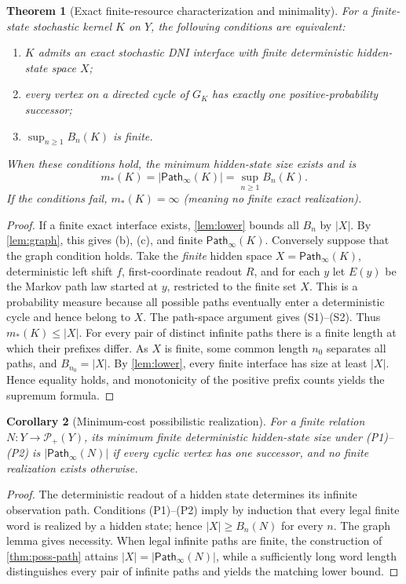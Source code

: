 \documentclass[11pt,letterpaper]{article}
\newtheorem{theorem}{Theorem}[section]
\newtheorem{corollary}[theorem]{Corollary}
\theoremstyle{definition}\newtheorem{definition}[theorem]{Definition}
\theoremstyle{remark}\newtheorem{remark}[theorem]{Remark}
\newcommand{\PP}{\mathcal{P}}
\newcommand{\Paths}{\mathsf{Path}}
\begin{document}
\begin{theorem}[Exact finite-resource characterization and minimality]\label{thm:minimum}
For a finite-state stochastic kernel $K$ on $Y$, the following conditions are equivalent:
\begin{enumerate}[label=(\alph*)]
\item $K$ admits an exact stochastic DNI interface with finite deterministic hidden-state space $X$;
\item every vertex on a directed cycle of $G_K$ has exactly one positive-probability successor;
\item $\sup_{n\ge1}B_n(K)$ is finite.
\end{enumerate}
When these conditions hold, the minimum hidden-state size exists and is
\begin{equation}\label{eq:minimum}
\boxed{m_*(K)=|\Paths_\infty(K)|=\sup_{n\ge1}B_n(K).}
\end{equation}
If the conditions fail, $m_*(K)=\infty$ (meaning no \emph{finite} exact realization).
\end{theorem}
\begin{proof}
If a finite exact interface exists, \cref{lem:lower} bounds all $B_n$ by $|X|$. By \cref{lem:graph}, this gives (b), (c), and finite $\Paths_\infty(K)$.
Conversely suppose that the graph condition holds. Take the \emph{finite} hidden space $X=\Paths_\infty(K)$, deterministic left shift $f$, first-coordinate readout $R$, and for each $y$ let $E(y)$ be the Markov path law started at $y$, restricted to the finite set $X$. This is a probability measure because all possible paths eventually enter a deterministic cycle and hence belong to $X$. The path-space argument gives (S1)--(S2). Thus $m_*(K)\le|X|$.
For every pair of distinct infinite paths there is a finite length at which their prefixes differ. As $X$ is finite, some common length $n_0$ separates all paths, and $B_{n_0}=|X|$. By \cref{lem:lower}, every finite interface has size at least $|X|$. Hence equality holds, and monotonicity of the positive prefix counts yields the supremum formula.
\end{proof}
\begin{corollary}[Minimum-cost possibilistic realization]\label{cor:poss-min}
For a finite relation $N:Y\to\PP_+(Y)$, its minimum finite deterministic hidden-state size under (P1)--(P2) is $|\Paths_\infty(N)|$ if every cyclic vertex has one successor, and no finite realization exists otherwise.
\end{corollary}
\begin{proof}
The deterministic readout of a hidden state determines its infinite observation path. Conditions (P1)--(P2) imply by induction that every legal finite word is realized by a hidden state; hence $|X|\ge B_n(N)$ for every $n$. The graph lemma gives necessity. When legal infinite paths are finite, the construction of \cref{thm:poss-path} attains $|X|=|\Paths_\infty(N)|$, while a sufficiently long word length distinguishes every pair of infinite paths and yields the matching lower bound.
\end{proof}
\end{document}
